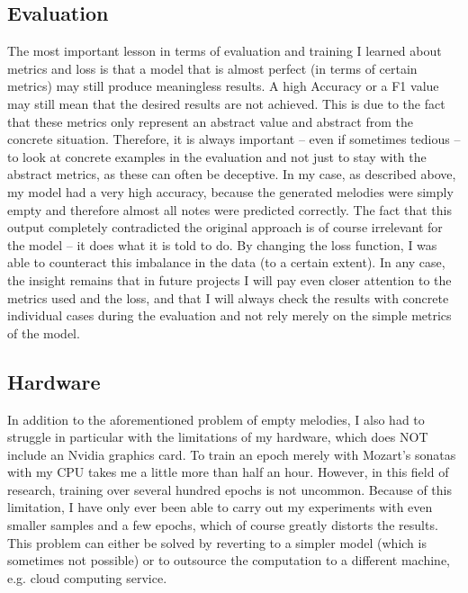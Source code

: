 \documentclass[a4paper, 10pt, xcolor=dvipsnames]{article} %
\begin{document}
\subsection{Evaluation}
The most important lesson in terms of evaluation and training I learned about
metrics and loss is that a model that is almost perfect (in terms of certain
metrics) may still produce meaningless results. A high Accuracy or a F1 value
may still mean that the desired results are not achieved. This is due to the
fact that these metrics only represent an abstract value and abstract from the
concrete situation. Therefore, it is always important -- even if sometimes
tedious -- to look at concrete examples in the evaluation and not just to stay
with the abstract metrics, as these can often be deceptive. In my case, as
described above, my model had a very high accuracy, because the generated
melodies were simply empty and therefore almost all notes were predicted
correctly. The fact that this output completely contradicted the original
approach is of course irrelevant for the model -- it does what it is told to do.
By changing the loss function, I was able to counteract this imbalance in the
data (to a certain extent). In any case, the insight remains that in future
projects I will pay even closer attention to the metrics used and the loss, and
that I will always check the results with concrete individual cases during the
evaluation and not rely merely on the simple metrics of the model.

\subsection{Hardware}
In addition to the aforementioned problem of empty melodies, I also had to
struggle in particular with the limitations of my hardware, which does NOT
include an Nvidia graphics card. To train an epoch merely with Mozart's sonatas
with my CPU takes me a little more than half an hour. However, in this field of
research, training over several hundred epochs is not uncommon. Because of this
limitation, I have only ever been able to carry out my experiments with even
smaller samples and a few epochs, which of course greatly distorts the results.
This problem can either be solved by reverting to a simpler model (which is
sometimes not possible) or to outsource the computation to a different machine,
e.g. cloud computing service.
\end{document}
